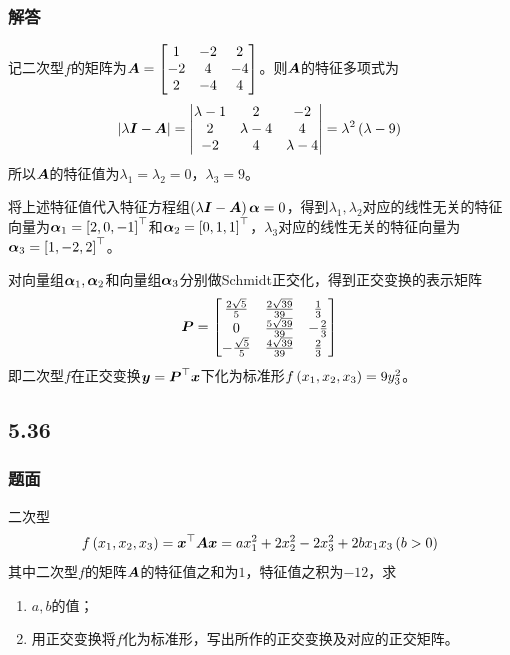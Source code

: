 \documentclass{beamer}
\begin{document}
\begin{frame}[allowframebreaks]
    \frametitle{解答}
    记二次型\(f\)的矩阵为\(\boldsymbol{A}=\begin{bmatrix}1&-2&2\\-2&4&-4\\2&-4&4\end{bmatrix}\)。则\(\boldsymbol{A}\)的特征多项式为
    \begin{equation*}
        \left|\lambda\boldsymbol{I}-\boldsymbol{A} \right|=\begin{vmatrix}\lambda-1&2&-2\\2&\lambda-4&4\\-2&4&\lambda-4\end{vmatrix}=\lambda^2\left( \lambda-9 \right)
    \end{equation*}
    所以\(\boldsymbol{A}\)的特征值为\(\lambda_1=\lambda_2=0\)，\(\lambda_3=9\)。

    将上述特征值代入特征方程组\(\left( \lambda\boldsymbol{I}-\boldsymbol{A} \right)\boldsymbol{\alpha}=0\)，得到\(\lambda_1,\lambda_2\)对应的线性无关的特征向量为\(\boldsymbol{\alpha}_1=\left[ 2,0,-1 \right]^\top\)和\(\boldsymbol{\alpha}_2=\left[ 0,1,1 \right]^\top\)，\(\lambda_3\)对应的线性无关的特征向量为\(\boldsymbol{\alpha}_3=\left[ 1,-2,2 \right]^\top\)。

    对向量组\(\boldsymbol{\alpha}_1,\boldsymbol{\alpha}_2\)和向量组\(\boldsymbol{\alpha}_3\)分别做Schmidt正交化，得到正交变换的表示矩阵
    \begin{equation*}
        \boldsymbol{P}=
        \begin{bmatrix}
            \frac{2\sqrt{5}}{5} & \frac{2\sqrt{39}}{39} & \frac{1}{3}  \\
            0                   & \frac{5\sqrt{39}}{39} & -\frac{2}{3} \\
            -\frac{\sqrt{5}}{5} & \frac{4\sqrt{39}}{39} & \frac{2}{3}
        \end{bmatrix}
    \end{equation*}
    即二次型\(f\)在正交变换\(\boldsymbol{y}=\boldsymbol{P}^\top\boldsymbol{x}\)下化为标准形\(f\left( x_1,x_2,x_3 \right)=9y_3^2\)。
\end{frame}

\subsection*{5.36}
\begin{frame}
    \frametitle{题面}
    二次型
    \begin{equation*}
        f\left( x_1,x_2,x_3 \right)=\boldsymbol{x}^\top\boldsymbol{A}\boldsymbol{x}=ax_1^2+2x_2^2-2x_3^2+2bx_1x_3\left( b>0 \right)
    \end{equation*}
    其中二次型\(f\)的矩阵\(\boldsymbol{A}\)的特征值之和为\(1\)，特征值之积为\(-12\)，求
    \begin{enumerate}
        \item \(a,b\)的值；
        \item 用正交变换将\(f\)化为标准形，写出所作的正交变换及对应的正交矩阵。
    \end{enumerate}
\end{frame}
\end{document}
